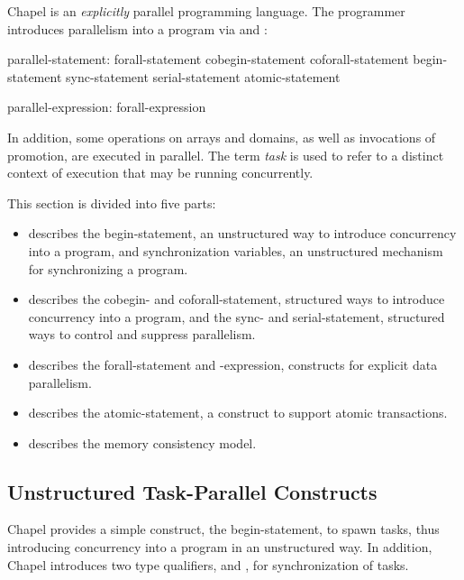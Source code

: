 \label{Parallelism_and_Synchronization}

Chapel is an {\em explicitly} parallel programming language.  The
programmer introduces parallelism into a program
via  and :
\begin{syntax}
parallel-statement:
  forall-statement
  cobegin-statement
  coforall-statement
  begin-statement
  sync-statement
  serial-statement
  atomic-statement

parallel-expression:
  forall-expression
\end{syntax}

In addition, some operations on arrays and domains, as well as
invocations of promotion, are executed in parallel.  The
term \emph{task} is used to refer to a distinct context of execution
that may be running concurrently.

This section is divided into five parts:
\begin{itemize}
\item {}
describes the begin-statement, an unstructured way to introduce
concurrency into a program, and synchronization variables, an
unstructured mechanism for synchronizing a program.
\item {}
describes the cobegin- and coforall-statement, structured ways to
introduce concurrency into a program, and the sync- and
serial-statement, structured ways to control and suppress parallelism.
\item {}
describes the forall-statement and -expression, constructs for
explicit data parallelism.
\item {}
describes the atomic-statement, a construct to support atomic
transactions.
\item {}
describes the memory consistency model.
\end{itemize}

\subsection{Unstructured Task-Parallel Constructs}
\label{unstructured_task_parallelism}

Chapel provides a simple construct, the begin-statement, to spawn
tasks, thus introducing concurrency into a program in an unstructured
way.  In addition, Chapel introduces two type qualifiers, 
and , for synchronization of tasks.

